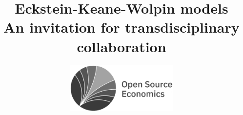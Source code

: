 
\title{Eckstein-Keane-Wolpin models\\
	\large An invitation for transdisciplinary collaboration\vspace{0.25cm}}
\author{
	\includegraphics[height=2.5cm]{../material/crop-ose-logo-black-white.pdf} \vspace{-5.5cm} \\ \hspace{6.1cm}
	}
\date{}
